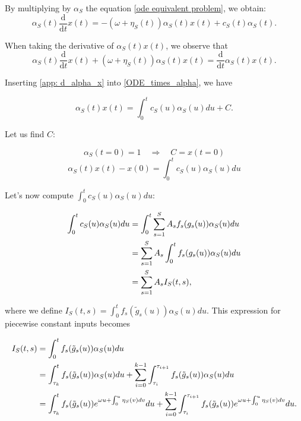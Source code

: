 \documentclass{article}
\begin{document}
By multiplying by $\alpha_S$ the equation \eqref{ode equivalent problem}, we obtain: 
\begin{equation} \label{ODE_times_alpha}
\alpha_S(t) \frac{\mathrm{d}}{\mathrm{d}t}x(t)  = -  (\omega + \eta_S(t)) \alpha_S(t) x (t) + c_S(t) \alpha_S(t).    
\end{equation}

When taking the derivative of $\alpha_S(t) x(t)$, we observe that 
\begin{equation}\label{app: d_alpha_x}
\alpha_S(t) \frac{\mathrm{d}}{\mathrm{d}t}x(t) + (\omega + \eta_S(t)) \alpha_S(t) x (t) = \frac{\mathrm{d} }{\mathrm{d}t}\alpha_S(t) x(t).    
\end{equation}

Inserting \eqref{app: d_alpha_x} into \eqref{ODE_times_alpha}, we have

\begin{equation} \label{ODE_x(t)}
\alpha_S(t) x(t) = \int_0^t c_S(u) \alpha_S(u) du + C.
\end{equation}

Let us find \(C\):

\begin{equation}
\alpha_S(t = 0) = 1 \quad \Rightarrow \quad C = x (t = 0)
\end{equation}
\begin{equation}
\alpha_S(t) x (t) - x (0) = \int_0^t c_S(u) \alpha_S(u) du
\end{equation}

Let's now compute \(\int_0^t c_S(u) \alpha_S(u) du\):

\begin{align}
    \int_0^t c_S(u) \alpha_S(u) du 
    &= \int_0^t \sum_{s=1}^S A_s f_s(g_s(u))\alpha_S(u) du \notag \\
    &= \sum_{s=1}^S A_s \int_0^t f_s(g_s(u))\alpha_S(u) du \notag\\
    & =  \sum_{s=1}^S A_s I_{S}(t, s),
\end{align}

where we define $I_{S}(t, s) = \int_0^t f_s(\tilde{g}_s(u))\alpha_S(u) du $. This expression for piecewise constant inputs becomes

\begin{align}
     I_{S}(t,s) &= \int_0^t f_s(\tilde{g}_s(u))\alpha_S(u) du \notag \\
     &=\int_{\tau_k}^t  f_s(\tilde{g}_s(u))\alpha_S(u) du  + \sum_{i=0}^{k-1}\int_{\tau_i}^{\tau_{i+1} }f_s(\tilde{g}_s(u))\alpha_S(u) du \notag \\
     &=\int_{\tau_k}^{t } f_s(\tilde{g}_s(u)) e^{\omega u + \int_0^u \eta_S(v) dv}du+ \sum_{i=0}^{k-1}\int_{\tau_i}^{\tau_{i+1} } f_s(\tilde{g}_s(u)) e^{\omega u + \int_0^u \eta_S(v) dv}du. 
\end{align}
\end{document}
